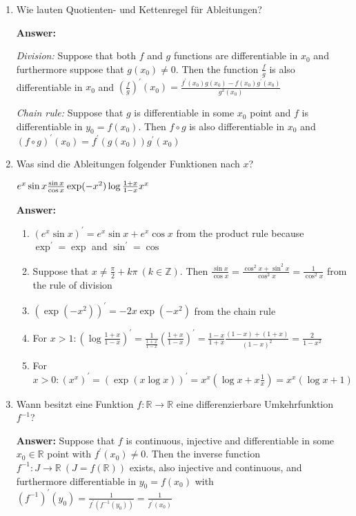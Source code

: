 \documentclass[11pt]{article}
\newcommand{\RR}[0]{\mathbb{R}}
\newcommand{\ZZ}[0]{\mathbb{Z}}
\begin{document}
\begin{enumerate}
    \item Wie lauten Quotienten- und Kettenregel für Ableitungen?
    
    \textbf{Answer:}

    \textit{Division:} Suppose that both $f$ and $g$ functions are differentiable in $x_0$ and furthermore suppose that $g(x_0) \neq 0$. Then the function $\frac{f}{g}$ is also differentiable in $x_0$ and $\left(\frac{f}{g}\right)^\prime(x_0) = \frac{f^\prime(x_0)g(x_0)-f(x_0)g^\prime(x_0)}{g^2(x_0)}$
    
    \textit{Chain rule:} Suppose that $g$ is differentiable in some $x_0$ point and $f$ is differentiable in $y_0 = f(x_0)$. Then $f \circ g$ is also differentiable in $x_0$ and $(f \circ g)^\prime(x_0) = f^\prime(g(x_0))g^\prime(x_0)$

    \item Was sind die Ableitungen folgender Funktionen nach $x$?
    
    \hspace*{\fill}
    $e^x \sin{x} \hfill \frac{\sin{x}}{\cos{x}}\hfill \exp(-x^2)\hfill \log{\frac{1+x}{1-x}}\hfill x^x$
    \hspace*{\fill}

    \textbf{Answer:}
    \begin{enumerate}
        \item $(e^x \sin{x})^\prime = e^x \sin{x} + e^x \cos{x}$ from the product rule because $\exp^\prime = \exp$ and $\sin^\prime = \cos$
        \item Suppose that $x \neq \frac{\pi}{2} + k\pi~(k \in \ZZ)$. Then $\frac{\sin{x}}{\cos{x}} = \frac{\cos^2{x} + \sin^2{x}}{\cos^2{x}} = \frac{1}{\cos^2{x}}$ from the rule of division
        \item $(\exp(-x^2))^\prime = -2x\exp(-x^2)$ from the chain rule
        \item For $x > 1\colon (\log\frac{1+x}{1-x})^\prime = \frac{1}{\frac{1+x}{1-x}} (\frac{1+x}{1-x})^\prime = \frac{1-x}{1+x} \frac{(1-x) + (1+x)}{(1-x)^2}=\frac{2}{1-x^2}$
        \item For $x > 0\colon (x^x)^\prime = (\exp(x \log{x}))^\prime = x^x (\log{x} + x\frac{1}{x}) = x^x (\log{x} + 1)$
    \end{enumerate}

    \item Wann besitzt eine Funktion $f\colon \RR\to\RR$ eine differenzierbare Umkehrfunktion $f^{-1}$?
    
    \textbf{Answer:} Suppose that $f$ is continuous, injective and differentiable in some $x_0 \in \RR$ point with $f^\prime(x_0) \neq 0$. Then the inverse function  $f^{-1}\colon J \to \RR~(J = f(\RR))$ exists, also injective and continuous, and furthermore differentiable in $y_0 = f(x_0)$ with $(f^{-1})^\prime(y_0) = \frac{1}{f^\prime(f^{-1}(y_0))} = \frac{1}{f^\prime(x_0)}$


\end{enumerate}
\end{document}
